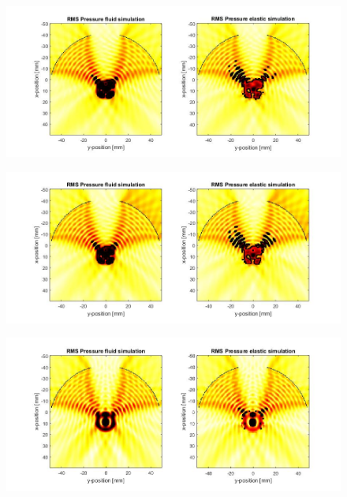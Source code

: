 \documentclass[10pt,a4paper]{article}
\begin{document}
\begin{figure}[H]\label{comp_230kHz}
\hspace*{-4cm}                                                    
\includegraphics[scale=0.6]{comp_230kHz}
\end{figure}
\begin{figure}[H]\label{comp_240kHz}
\hspace*{-4cm}                                                    
\includegraphics[scale=0.6]{comp_240kHz}
\end{figure}
\begin{figure}[H]\label{comp_250kHz}
\hspace*{-4cm}                                                    
\includegraphics[scale=0.6]{comp_250kHz}
\end{figure}
\end{document}
